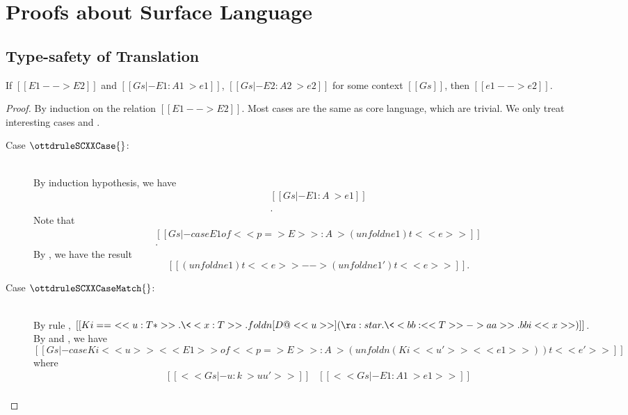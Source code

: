 \section{Proofs about Surface Language}
\subsection{Type-safety of Translation}
\begin{lem}\label{lem:appendix:src:redtr}
If $[[E1 --> E2]]$ and $[[Gs |- E1 : A1 ~> e1]]$, $[[Gs |- E2 : A2 ~> e2]]$ for
some context $[[Gs]]$, then $[[e1 --> e2]]$.
\end{lem}

\begin{proof}
    By induction on the relation $[[E1 --> E2]]$. Most cases are the same as
core language, which are trivial. We only treat interesting cases
 and .
    \begin{description}
        \item[Case \scriptsize{$\ottdruleSCXXCase{}$}:] $\quad$ \\
        By induction hypothesis, we have 
        \[\begin{array}{l}
        [[Gs |- E1 : A ~> e1]] \\ 
        [[Gs |- E1': A' ~> e1']] \\ 
        [[e1 --> e1']].
        \end{array} \]
        Note that 
        \[\begin{array}{l}
            [[Gs |- case E1 of << p => E >> : A ~> (unfoldn e1) t <<e>>]] \\ 
            [[Gs |- case E1' of << p => E >> : A ~> (unfoldn e1') t <<e>>]]. 
        \end{array} \] 
    By , we have the result
\[ [[(unfoldn e1) t <<e>> --> (unfoldn e1') t <<e>>]]. \]
        \item[Case \scriptsize{$\ottdruleSCXXCaseMatch{}$}:] $\quad$ \\
        By rule , $[[Ki == \ <<u:T*>> . \<<x:T>> . foldn
[D@<<u>>] (\aa:star.\<<bb : <<T>> -> aa >> . bbi <<x>>)]]$. By
 and , we have 
        \[
        [[Gs |- case Ki <<u>>
        <<E1>> of <<p=>E>> : A ~> (unfoldn (Ki <<u'>> <<e1>>)) t <<e'>>]]
        \]
where
        \[ \begin{array}{ll}
                [[<<Gs |- u : k ~> uu'>>]]
                & [[<<Gs |- E1 : A1 ~> e1>>]] \\

\end{array}\]
\end{description}
\end{proof}
